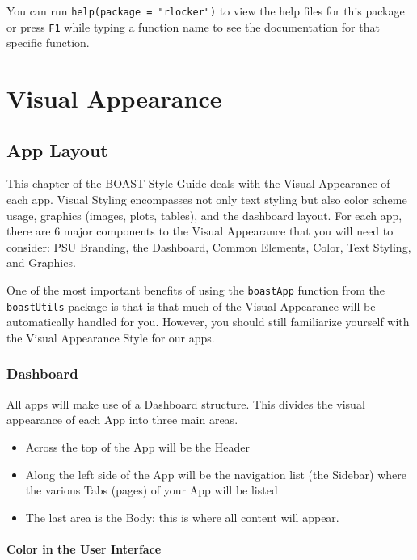 \documentclass[
]{book}
\providecommand{\tightlist}{%
  \setlength{\itemsep}{0pt}\setlength{\parskip}{0pt}}
\begin{document}
You can run \texttt{help(package\ =\ "rlocker")} to view the help files for this package or press \texttt{F1} while typing a function name to see the documentation for that specific function.

\hypertarget{part-visual-appearance}{%
\part{Visual Appearance}\label{part-visual-appearance}}

\hypertarget{layot}{%
\chapter{App Layout}\label{layot}}

This chapter of the BOAST Style Guide deals with the Visual Appearance of each app. Visual Styling encompasses not only text styling but also color scheme usage, graphics (images, plots, tables), and the dashboard layout. For each app, there are 6 major components to the Visual Appearance that you will need to consider: PSU Branding, the Dashboard, Common Elements, Color, Text Styling, and Graphics.

One of the most important benefits of using the \texttt{boastApp} function from the \texttt{boastUtils} package is that is that much of the Visual Appearance will be automatically handled for you. However, you should still familiarize yourself with the Visual Appearance Style for our apps.

\hypertarget{dashboard}{%
\section{Dashboard}\label{dashboard}}

All apps will make use of a Dashboard structure. This divides the visual appearance of each App into three main areas.

\begin{itemize}
\tightlist
\item
  Across the top of the App will be the Header
\item
  Along the left side of the App will be the navigation list (the Sidebar) where the various Tabs (pages) of your App will be listed
\item
  The last area is the Body; this is where all content will appear.
\end{itemize}

\hypertarget{colorUI}{%
\subsection{Color in the User Interface}\label{colorUI}}
\end{document}
